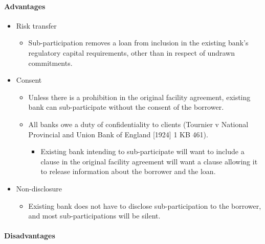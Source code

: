 \documentclass[
]{article}
\providecommand{\tightlist}{%
  \setlength{\itemsep}{0pt}\setlength{\parskip}{0pt}}
\begin{document}
\hypertarget{advantages-3}{%
\paragraph{Advantages}\label{advantages-3}}

\begin{itemize}
\tightlist
\item
  Risk transfer

  \begin{itemize}
  \tightlist
  \item
    Sub-participation removes a loan from inclusion in the existing
    bank's regulatory capital requirements, other than in respect of
    undrawn commitments.
  \end{itemize}
\item
  Consent

  \begin{itemize}
  \tightlist
  \item
    Unless there is a prohibition in the original facility agreement,
    existing bank can sub-participate without the consent of the
    borrower.
  \item
    All banks owe a duty of confidentiality to clients (Tournier v
    National Provincial and Union Bank of England {[}1924{]} 1 KB 461).

    \begin{itemize}
    \tightlist
    \item
      Existing bank intending to sub-participate will want to include a
      clause in the original facility agreement will want a clause
      allowing it to release information about the borrower and the
      loan.
    \end{itemize}
  \end{itemize}
\item
  Non-disclosure

  \begin{itemize}
  \tightlist
  \item
    Existing bank does not have to disclose sub-participation to the
    borrower, and most sub-participations will be silent.
  \end{itemize}
\end{itemize}

\hypertarget{disadvantages-3}{%
\paragraph{Disadvantages}\label{disadvantages-3}}
\end{document}
